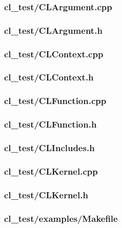 \documentclass{article}
\begin{document}
\subsubsection*{cl\_test/CLArgument.cpp}


\subsubsection*{cl\_test/CLArgument.h}


\subsubsection*{cl\_test/CLContext.cpp}


\subsubsection*{cl\_test/CLContext.h}


\subsubsection*{cl\_test/CLFunction.cpp}


\subsubsection*{cl\_test/CLFunction.h}


\subsubsection*{cl\_test/CLIncludes.h}


\subsubsection*{cl\_test/CLKernel.cpp}


\subsubsection*{cl\_test/CLKernel.h}


\subsubsection*{cl\_test/examples/Makefile}

\end{document}
